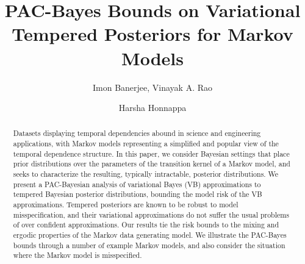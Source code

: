 \documentclass[11pt]{amsart}
\begin{document}
\title[PAC-Bayes for Markov Models]{PAC-Bayes Bounds on Variational Tempered Posteriors for Markov Models}
\author{Imon Banerjee, Vinayak A. Rao}
\address{Department of Statistics, Purdue University, West Lafayette IN 47906}

\author{Harsha Honnappa}
\address{School of Industrial Engineering, Purdue University, West Lafayette IN 47906}

\date{}
\maketitle
\begin{abstract}
    
    Datasets displaying temporal dependencies abound in science and engineering applications, with
    Markov models representing a simplified and popular view of the temporal dependence structure. %
    In this paper, we consider Bayesian settings that place prior distributions over the parameters of the transition kernel of a Markov model, and seeks to characterize the resulting, typically intractable, posterior distributions.
    We present a PAC-Bayesian analysis of variational Bayes (VB) approximations to tempered Bayesian posterior distributions, bounding the model risk of the VB approximations.
    Tempered posteriors are known to be robust to model misspecification, and their variational approximations do not suffer the usual problems of over confident approximations.
    Our results tie the risk bounds to the mixing and ergodic properties of the Markov data generating model. We illustrate the PAC-Bayes bounds through a number of example Markov models, and also consider the situation where the Markov model is misspecified.
\end{abstract}
\end{document}
